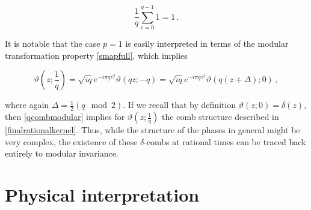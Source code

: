 \documentclass{article}
\newcommand{\T}{\ensuremath{\vartheta}}
\newcommand{\sumZ}{\sum_{n=-\infty}^{\infty}}
\begin{document}
\begin{equation}
    \frac{1}{q}\sum_{c=0}^{q-1} 1 = 1\,.
\end{equation}

It is notable that the case $p = 1$ is easily interpreted in terms of the modular transformation property \eqref{smapfull}, which implies

\begin{equation}\label{qcombmodular}
    \vartheta\left(z;\frac{1}{q}\right) = \sqrt{iq} e^{-i\pi q z^2} \T(qz;-q) = \sqrt{iq} e^{-i\pi q z^2} \T(q(z+\Delta);0)\,,
\end{equation}

where again $\Delta = \frac{1}{2} (q \mod 2)$. If we recall that by definition $\T(z;0) = \delta(z)$, then \eqref{qcombmodular} implies for $\T(z;\frac{1}{q})$ the comb structure described in \eqref{finalrationalkernel}. Thus, while the structure of the phases in general might be very complex, the existence of these $\delta$-combs at rational times can be traced back entirely to modular invariance.

%
%
%
%
%


\section{Physical interpretation}
\end{document}
